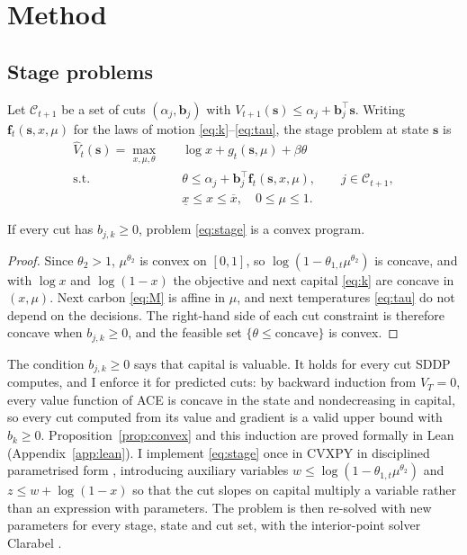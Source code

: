 \section{Method}
\label{sec:method}

\subsection{Stage problems}

Let $\mathcal{C}_{t+1}$ be a set of cuts $(\alpha_j, \bm{b}_j)$ with $V_{t+1}(\bm{s}) \le \alpha_j + \bm{b}_j^\top\bm{s}$. Writing $\bm{f}_t(\bm{s}, x, \mu)$ for the laws of motion \eqref{eq:k}--\eqref{eq:tau}, the stage problem at state $\bm{s}$ is
\begin{equation}
\begin{aligned}
    \hat V_t(\bm{s}) = \max_{x, \mu, \theta}\quad & \log x + g_t(\bm{s}, \mu) + \beta\theta \\
    \text{s.t.}\quad & \theta \le \alpha_j + \bm{b}_j^\top \bm{f}_t(\bm{s}, x, \mu), \qquad j \in \mathcal{C}_{t+1}, \\
    & \underline{x} \le x \le \overline{x}, \quad 0 \le \mu \le 1 .
\end{aligned}
\tag{P$_t$}
\label{eq:stage}
\end{equation}

\begin{proposition}[Convexity]
\label{prop:convex}
If every cut has $b_{j,k} \ge 0$, problem \eqref{eq:stage} is a convex program.
\end{proposition}

\begin{proof}
Since $\theta_2 > 1$, $\mu^{\theta_2}$ is convex on $[0,1]$, so $\log(1 - \theta_{1,t}\mu^{\theta_2})$ is concave, and with $\log x$ and $\log(1-x)$ the objective and next capital \eqref{eq:k} are concave in $(x, \mu)$. Next carbon \eqref{eq:M} is affine in $\mu$, and next temperatures \eqref{eq:tau} do not depend on the decisions. The right-hand side of each cut constraint is therefore concave when $b_{j,k} \ge 0$, and the feasible set $\{\theta \le \text{concave}\}$ is convex.
\end{proof}

The condition $b_{j,k} \ge 0$ says that capital is valuable. It holds for every cut SDDP computes, and I enforce it for predicted cuts: by backward induction from $V_T = 0$, every value function of ACE is concave in the state and nondecreasing in capital, so every cut computed from its value and gradient is a valid upper bound with $b_k \ge 0$. Proposition~\ref{prop:convex} and this induction are proved formally in Lean (Appendix~\ref{app:lean}). I implement \eqref{eq:stage} once in CVXPY \parencite{DiamondBoyd2016} in disciplined parametrised form \parencite{Agrawal2019DPP}, introducing auxiliary variables $w \le \log(1-\theta_{1,t}\mu^{\theta_2})$ and $z \le w + \log(1-x)$ so that the cut slopes on capital multiply a variable rather than an expression with parameters. The problem is then re-solved with new parameters for every stage, state and cut set, with the interior-point solver Clarabel \parencite{GoulartChen2024Clarabel}.

